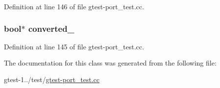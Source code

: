 \-Definition at line 146 of file gtest-\/port\-\_\-test.\-cc.

\hypertarget{classtesting_1_1internal_1_1ConstAndNonConstCastable_aa9e9eeb1a81afc42911a2a8b17e9618b}{
\subsubsection[{converted\-\_\-}]{\setlength{\rightskip}{0pt plus 5cm}bool$\ast$ {\bf converted\-\_\-}}}\label{d3/d02/classtesting_1_1internal_1_1ConstAndNonConstCastable_aa9e9eeb1a81afc42911a2a8b17e9618b}


\-Definition at line 145 of file gtest-\/port\-\_\-test.\-cc.



\-The documentation for this class was generated from the following file\-:\begin{DoxyCompactItemize}
\item 
gtest-\/1../test/\hyperlink{gtest-port__test_8cc}{gtest-\/port\-\_\-test.\-cc}\end{DoxyCompactItemize}
